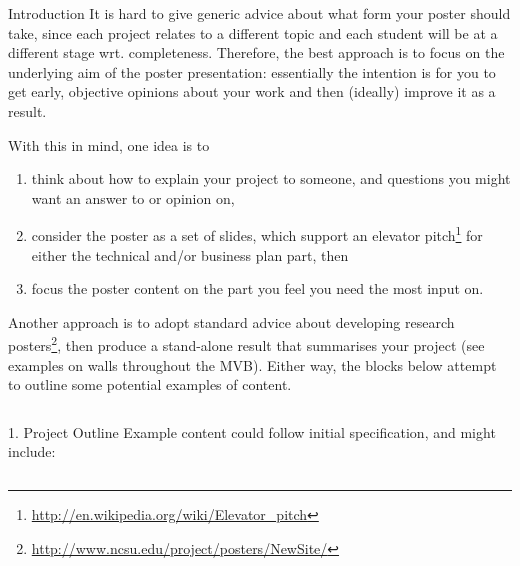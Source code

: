 \documentclass[ %
                    author={Daniel Page},
                supervisor={Dr. Ian Holyer},
                     title={Some Structural Guidelines for CS MEng Posters},
                  subtitle={},
                    degree={MEng},
                      year={2012} ]{poster}
\begin{document}

\begin{frame}{} 

\vfill

\begin{columns}[t]
  \begin{column}{0.900\linewidth}
  \begin{block}{\Large Introduction}
  It is hard to give generic advice about what form your poster should 
  take, since each project relates to a different topic and each student
  will be at a different stage wrt. completeness.  Therefore, the best 
  approach is to focus on the underlying aim of the poster presentation:
  essentially the intention is for you to get early, objective opinions
  about your work and then (ideally) improve it as a result.

  With this in mind, one idea is to

  \begin{enumerate}
  \item think about how to explain your project to someone, and questions
        you might want an answer to or opinion on,
  \item consider the poster as a set of slides, which support an elevator
        pitch\footnote{\url{http://en.wikipedia.org/wiki/Elevator_pitch}}
        for either the technical and/or business plan part,
        then
  \item focus the poster content on the part you feel you need the most
        input on.
  \end{enumerate}

  \noindent
  Another approach is to adopt standard advice about developing research 
  posters\footnote{\url{http://www.ncsu.edu/project/posters/NewSite/}}, 
  then produce a stand-alone result that summarises your project (see
  examples on walls throughout the MVB).  Either way, the blocks below 
  attempt to outline some potential examples of content.
  \end{block}
  \end{column}
\end{columns}

\vfill

\begin{columns}[t]
  \begin{column}{0.422\linewidth}
  \begin{block}{\Large 1. Project Outline}
  Example content could follow initial specification, and might include:


\end{block}
\end{column}
\end{columns}
\end{frame}
\end{document}
